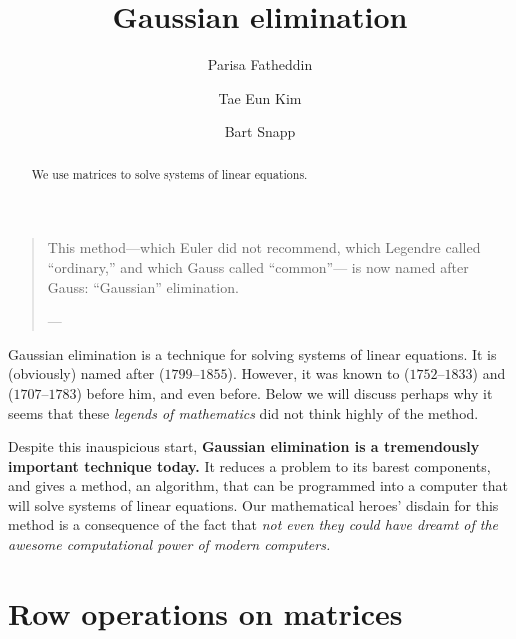 \documentclass{ximera}
\author{Parisa Fatheddin \and Tae Eun Kim \and Bart Snapp}
\title{Gaussian elimination}
\begin{document}
\begin{abstract}
  We use matrices to solve systems of linear equations.
\end{abstract}
\maketitle

\begin{quote}
  This method---which Euler did not recommend, which Legendre called ``ordinary,'' and which Gauss called ``common''--- is now named after Gauss: ``Gaussian'' elimination.


\hfill ---
\end{quote}

Gaussian elimination is a technique for solving systems of linear
equations. It is (obviously) named after
($1799$--$1855$). However, it was known to
($1752$--$1833$) and
($1707$--$1783$) before him, and even before. Below we will discuss
perhaps why it seems that these \textit{legends of mathematics} did
not think highly of the method.






Despite this inauspicious start, \textbf{Gaussian elimination is a
  tremendously important technique today.} It reduces a problem to its
barest components, and gives a method, an algorithm, that can be
programmed into a computer that will solve systems of linear
equations. Our mathematical heroes' disdain for this method is a
consequence of the fact that \textit{not even they could have dreamt
  of the awesome computational power of modern computers.}



\section{Row operations on matrices}
\end{document}
